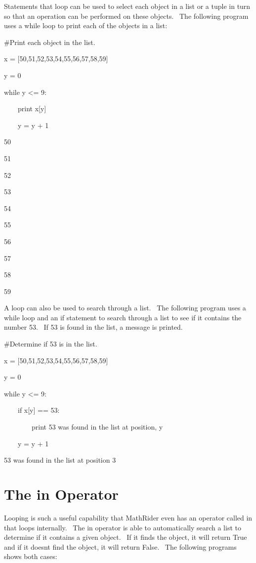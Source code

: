 \documentclass[12pt,twoside]{book}
\begin{document}
Statements that loop can be used to select each object in a list or a tuple in turn so that an operation can be performed on these objects. \ The following program uses a while loop to print each of the objects in a list: 

\bigskip

\#Print each object in the list.

x = [50,51,52,53,54,55,56,57,58,59]

y = 0

while y {\textless}= 9:

\ \ \ \ print x[y]

\ \ \ \ y = y + 1

{\textbar}

50

51

52

53

54

55

56

57

58

59


\bigskip

A loop can also be used to search through a list. \ The following program uses a while loop and an if statement to search through a list to see if it contains the number 53. \ If 53 is found in the list, a message is printed. 

\bigskip

\#Determine if 53 is in the list.

x = [50,51,52,53,54,55,56,57,58,59]

y = 0

while y {\textless}= 9:

\ \ \ \ if x[y] == 53:

\ \ \ \ \ \ \ \ print {\textquotedbl}53 was found in the list at position{\textquotedbl}, y

\ \ \ \ y = y + 1

{\textbar}

53 was found in the list at position 3

\section[The in Operator]{The in Operator}

Looping is such a useful capability that MathRider even has an operator called in that loops internally. \ The in operator is able to automatically search a list to determine if it contains a given object. \ If it finds the object, it will return True and if it doesn{\textquotesingle}t find the object, it will return False. \ The following programs shows both cases: 
\end{document}
